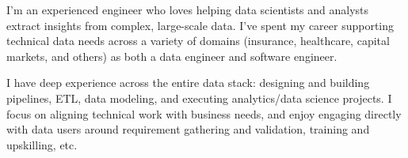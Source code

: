 

\begin{cvparagraph}


I'm an experienced engineer who loves helping data scientists and analysts extract insights from complex, large-scale data. I've spent my career supporting technical data needs across a variety of domains (insurance, healthcare, capital markets, and others) as both a data engineer and software engineer.

I have deep experience across the entire data stack: designing and building pipelines, ETL, data modeling, and executing analytics/data science projects. I focus on aligning technical work with business needs, and enjoy engaging directly with data users around requirement gathering and validation, training and upskilling, etc.

\end{cvparagraph}
